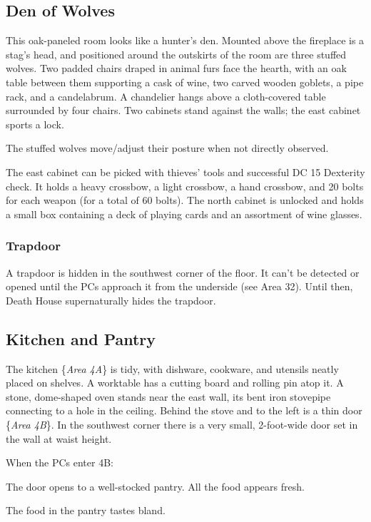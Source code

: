 \begin{arealinks}
\end{arealinks}


\pagebreak
\subsection{Den of Wolves}
\label{sec:DenOfWolves}
\begin{readout}
  This oak-paneled room looks like a hunter's den. Mounted above the fireplace is a stag's head, and positioned
  around the outskirts of the room are three stuffed wolves. Two padded chairs draped in animal furs face the
  hearth, with an oak table between them supporting a cask of wine, two carved wooden goblets, a pipe rack, and
  a candelabrum. A chandelier hangs above a cloth-covered table surrounded by four chairs. Two cabinets stand
  against the walls; the east cabinet sports a lock.
\end{readout}
The stuffed wolves move/adjust their posture when not directly observed.

The east cabinet can be picked with thieves' tools and successful DC 15 Dexterity check. It holds a heavy
crossbow, a light crossbow, a hand crossbow, and 20 bolts for each weapon (for a total of 60 bolts). The north
cabinet is unlocked and holds a small box containing a deck of playing cards and an assortment of wine glasses.

\subsubsection*{Trapdoor}
A trapdoor is hidden in the southwest corner of the floor. It can't be detected or opened until the PCs approach
it from the underside (see Area 32). Until then, Death House supernaturally hides the trapdoor.

\begin{arealinks}
\end{arealinks}


\pagebreak
\subsection{Kitchen and Pantry}
\label{sec:KitchenAndPantry}
\begin{readout}
  The kitchen \{\textit{Area 4A}\} is tidy, with dishware, cookware, and utensils neatly placed on shelves.
  A worktable has a cutting board and rolling pin atop it. A stone, dome-shaped oven stands near the east wall,
  its bent iron stovepipe connecting to a hole in the ceiling. Behind the stove and to the left is a thin door
  \{\textit{Area 4B}\}. In the southwest corner there is a very small, 2-foot-wide door set in the wall 
  at waist height.
\end{readout}
When the PCs enter 4B:
\begin{readout}
  The door opens to a well-stocked pantry. All the food appears fresh.
\end{readout}
The food in the pantry tastes bland.

